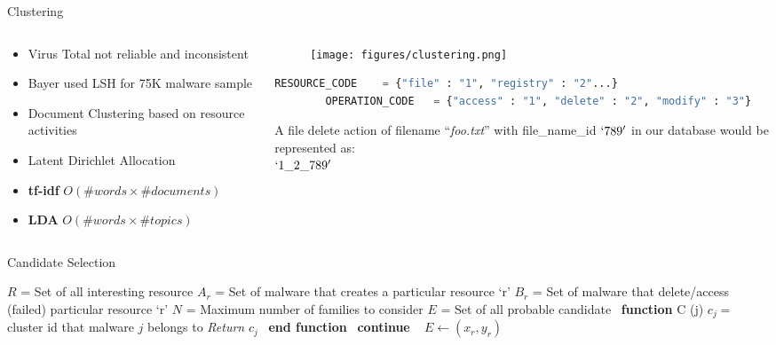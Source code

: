 \documentclass{beamer}
\begin{document}
\begin{frame}[h,fragile]{Clustering}
  \begin{columns}
    \begin{column}{5cm}
      \begin{itemize}
        \item Virus Total not reliable and inconsistent
        \item Bayer used LSH for 75K malware sample
        \item Document Clustering based on resource activities
        \item Latent Dirichlet Allocation
        \item \textbf{tf-idf} $O(\#words \times \#documents)$
        \item \textbf{LDA} $O(\#words \times \#topics)$
      \end{itemize}
    \end{column}
    \begin{column}{5cm}
      \begin{figure}[h]
        \centering
        \texttt{[image: figures/clustering.png]}
      \label{fig:malware_type}
      \end{figure}
      \begin{lstlisting}[numbers=none,basicstyle=\tiny,language=python]
        RESOURCE_CODE    = {"file" : "1", "registry" : "2"...}
        OPERATION_CODE   = {"access" : "1", "delete" : "2", "modify" : "3"}
      \end{lstlisting}
      A file delete action of filename ``\emph{foo.txt}'' with file\_name\_id $`789'$ in our database would be represented as:\\
      $`1\_2\_789'$
    \end{column}
  \end{columns}
\end{frame}
\begin{frame}[plain]{Candidate Selection}
\begin{algorithm}[H]
  \small
  \begin{algorithmic}[1]
    \STATE$R$   = Set of all interesting resource
    \STATE$A_r$ = Set of malware that creates a particular resource `r'
    \STATE$B_r$ = Set of malware that delete/access (failed) particular resource `r'
    \STATE$N$   = Maximum number of families to consider
    \STATE$E$   = Set of all probable candidate
    \STATE\ \textbf{function} C (j)
      \STATE\hspace{\algorithmicindent} $c_j =$ cluster id that malware $j$ belongs to
      \STATE\hspace{\algorithmicindent} \textit{Return} $c_j$
    \STATE\ \textbf{end function}
        \STATE\ \textbf{continue}
      \ENDIF\
          \STATE$E\gets (x_r, y_r)$
        \ENDIF\
      \ENDFOR\
    \ENDFOR\
  \end{algorithmic}
\end{algorithm}
\end{frame}
\end{document}
